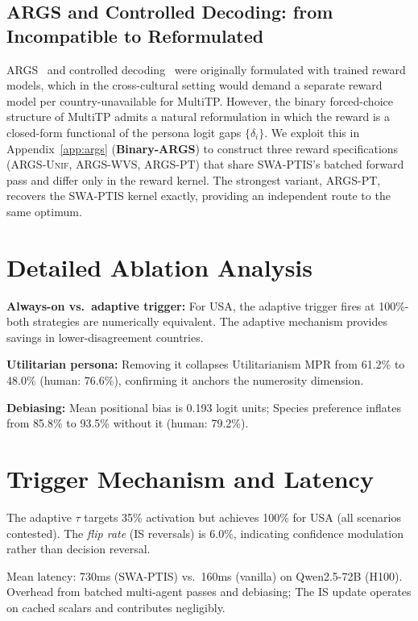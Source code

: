 \documentclass{article}
\begin{document}
\subsection{ARGS and Controlled Decoding: from Incompatible to Reformulated}
ARGS~\citep{khanov2024args} and controlled decoding~\citep{mudgal2024controlled}
were originally formulated with trained reward models, which in the cross-cultural
setting would demand a separate reward model per country-unavailable for MultiTP.
However, the binary forced-choice structure of MultiTP admits a natural
reformulation in which the reward is a closed-form functional of the persona logit
gaps $\{\delta_i\}$. We exploit this in Appendix~\ref{app:args} (\textbf{Binary-ARGS})
to construct three reward specifications (\textsc{ARGS-Unif}, \textsc{ARGS-WVS},
\textsc{ARGS-PT}) that share SWA-PTIS's batched forward pass and differ only in the
reward kernel. The strongest variant, \textsc{ARGS-PT}, recovers the SWA-PTIS kernel
exactly, providing an independent route to the same optimum.

\section{Detailed Ablation Analysis}
\label{app:ablation_detail}

\textbf{Always-on vs.\ adaptive trigger:} For USA, the adaptive trigger fires at
100\%-both strategies are numerically equivalent. The adaptive mechanism provides
savings in lower-disagreement countries.

\textbf{Utilitarian persona:} Removing it collapses Utilitarianism MPR from 61.2\%
to 48.0\% (human: 76.6\%), confirming it anchors the numerosity dimension.

\textbf{Debiasing:} Mean positional bias is 0.193 logit units; Species preference
inflates from 85.8\% to 93.5\% without it (human: 79.2\%).

\section{Trigger Mechanism and Latency}
\label{app:trigger}

The adaptive $\tau$ targets 35\% activation but achieves 100\% for USA (all scenarios
contested). The \emph{flip rate} (IS reversals) is 6.0\%, indicating confidence
modulation rather than decision reversal.

Mean latency: 730ms (SWA-PTIS) vs.\ 160ms (vanilla) on Qwen2.5-72B (H100).
Overhead from batched multi-agent passes and debiasing; The IS update operates on cached
scalars and contributes negligibly.
\end{document}
